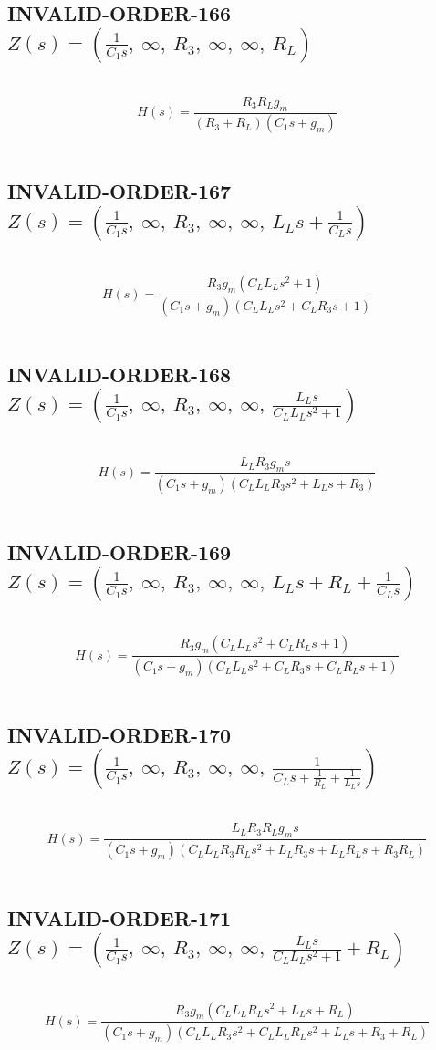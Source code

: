 \documentclass{article}
\begin{document}
\subsection{INVALID-ORDER-166 $Z(s) = \left( \frac{1}{C_{1} s}, \  \infty, \  R_{3}, \  \infty, \  \infty, \  R_{L}\right)$ } \ 
\textbf{\[H(s) = \frac{R_{3} R_{L} g_{m}}{\left(R_{3} + R_{L}\right) \left(C_{1} s + g_{m}\right)}\] } \ 
\subsection{INVALID-ORDER-167 $Z(s) = \left( \frac{1}{C_{1} s}, \  \infty, \  R_{3}, \  \infty, \  \infty, \  L_{L} s + \frac{1}{C_{L} s}\right)$ } \ 
\textbf{\[H(s) = \frac{R_{3} g_{m} \left(C_{L} L_{L} s^{2} + 1\right)}{\left(C_{1} s + g_{m}\right) \left(C_{L} L_{L} s^{2} + C_{L} R_{3} s + 1\right)}\] } \ 
\subsection{INVALID-ORDER-168 $Z(s) = \left( \frac{1}{C_{1} s}, \  \infty, \  R_{3}, \  \infty, \  \infty, \  \frac{L_{L} s}{C_{L} L_{L} s^{2} + 1}\right)$ } \ 
\textbf{\[H(s) = \frac{L_{L} R_{3} g_{m} s}{\left(C_{1} s + g_{m}\right) \left(C_{L} L_{L} R_{3} s^{2} + L_{L} s + R_{3}\right)}\] } \ 
\subsection{INVALID-ORDER-169 $Z(s) = \left( \frac{1}{C_{1} s}, \  \infty, \  R_{3}, \  \infty, \  \infty, \  L_{L} s + R_{L} + \frac{1}{C_{L} s}\right)$ } \ 
\textbf{\[H(s) = \frac{R_{3} g_{m} \left(C_{L} L_{L} s^{2} + C_{L} R_{L} s + 1\right)}{\left(C_{1} s + g_{m}\right) \left(C_{L} L_{L} s^{2} + C_{L} R_{3} s + C_{L} R_{L} s + 1\right)}\] } \ 
\subsection{INVALID-ORDER-170 $Z(s) = \left( \frac{1}{C_{1} s}, \  \infty, \  R_{3}, \  \infty, \  \infty, \  \frac{1}{C_{L} s + \frac{1}{R_{L}} + \frac{1}{L_{L} s}}\right)$ } \ 
\textbf{\[H(s) = \frac{L_{L} R_{3} R_{L} g_{m} s}{\left(C_{1} s + g_{m}\right) \left(C_{L} L_{L} R_{3} R_{L} s^{2} + L_{L} R_{3} s + L_{L} R_{L} s + R_{3} R_{L}\right)}\] } \ 
\subsection{INVALID-ORDER-171 $Z(s) = \left( \frac{1}{C_{1} s}, \  \infty, \  R_{3}, \  \infty, \  \infty, \  \frac{L_{L} s}{C_{L} L_{L} s^{2} + 1} + R_{L}\right)$ } \ 
\textbf{\[H(s) = \frac{R_{3} g_{m} \left(C_{L} L_{L} R_{L} s^{2} + L_{L} s + R_{L}\right)}{\left(C_{1} s + g_{m}\right) \left(C_{L} L_{L} R_{3} s^{2} + C_{L} L_{L} R_{L} s^{2} + L_{L} s + R_{3} + R_{L}\right)}\] } \ 
\end{document}
